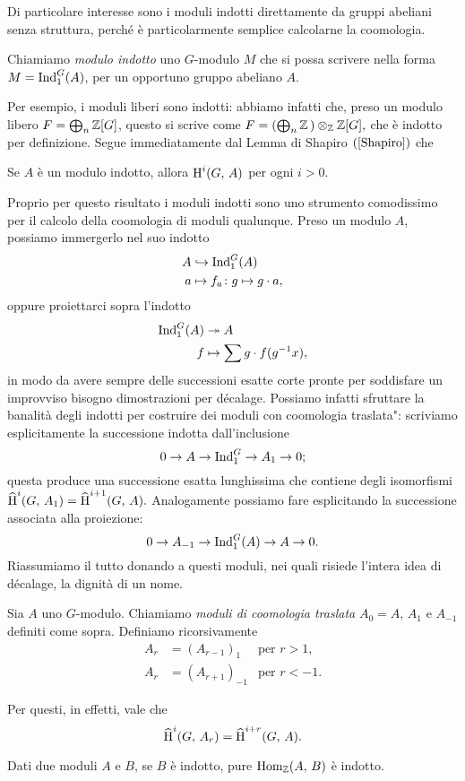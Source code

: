 Di particolare interesse sono i moduli indotti direttamente da gruppi abeliani senza struttura, perché è particolarmente semplice calcolarne la coomologia.

\begin{definition}
	Chiamiamo \emph{modulo indotto} uno $ G $-modulo $ M $ che si possa scrivere nella forma $ M = \operatorname{Ind}_1^G(A) $, per un opportuno gruppo abeliano $ A $.
\end{definition}

Per esempio, i moduli liberi sono indotti: abbiamo infatti che, preso un modulo libero $ F = \bigoplus_n \mathbb{Z}[G] $, questo si scrive come
$ F = \left(\bigoplus_n\mathbb{Z}\,\right) \otimes_{\mathbb{Z}} \mathbb{Z}[G],  $ che è indotto per definizione.
Segue immediatamente dal Lemma di Shapiro $ (\ref{Shapiro}) $ che
\begin{corollary}\label{indotti} \todo[potenziare]
	Se $ A $ è un modulo indotto, allora $ \operatorname{H}^i(G, \, A) $ per ogni $ i > 0 $.
\end{corollary}

Proprio per questo risultato i moduli indotti sono uno strumento comodissimo per il calcolo della coomologia di moduli qualunque. Preso un modulo $ A $, possiamo immergerlo nel suo indotto
\begin{align*}
	A &\hookrightarrow \operatorname{Ind}_1^G(A) \\
	a & \mapsto f_a \colon g \mapsto g \cdot a, \end{align*} 
oppure proiettarci sopra l'indotto
\begin{align*}
	\operatorname{Ind}_1^G(A) &\twoheadrightarrow A  \\
	f & \mapsto \sum g \cdot f(g^{-1}x),
\end{align*}
in modo da avere sempre delle successioni esatte corte pronte per soddisfare un improvviso bisogno dimostrazioni per décalage. Possiamo infatti sfruttare la banalità degli indotti per costruire dei moduli con coomologia \leftquote traslata": scriviamo esplicitamente la successione indotta dall'inclusione
\[ 0 \to A \to \operatorname{Ind}_1^G \to A_1 \to 0; \]
questa produce una successione esatta lunghissima che contiene degli isomorfismi
$ \operatorname{\widehat{H}}^{i}(G, \, A_1) = \operatorname{\widehat{H}}^{i+1}(G, \, A). $
Analogamente possiamo fare esplicitando la successione associata alla proiezione:
\[ 0 \to A_{-1} \to \operatorname{Ind}_1^G(A) \to A \to 0. \]
Riassumiamo il tutto donando a questi moduli, nei quali risiede l'intera idea di décalage, la dignità di un nome.

\begin{definition} \todo[brutto!]
	Sia $ A $ uno $ G $-modulo. Chiamiamo \emph{moduli di coomologia traslata} $ A_0 = A $, $ A_1 $ e $ A_{-1} $ definiti come sopra. Definiamo ricorsivamente
	\begin{align*}
		A_r & = (A_{r-1})_1 & \text{per  }  r > 1, \\
		A_r & = (A_{r+1})_{-1} &\text{per  } r < -1.
	\end{align*}
\end{definition}

Per questi, in effetti, vale che
\begin{equation}\label{traslati}
\operatorname{\widehat{H}}^{i}(G, \, A_r) = \operatorname{\widehat{H}}^{i+r}(G, \, A).
\end{equation}


\begin{lemma}\label{scappa} \todo[muori!]
	Dati due moduli $ A $ e $ B $, se $ B $ è indotto, pure $ \operatorname{Hom}_{\mathbb{Z}}(A, \, B) $ è indotto.
\end{lemma}